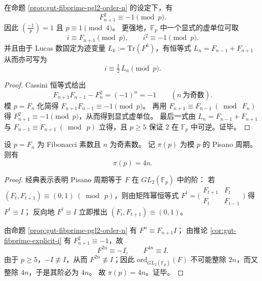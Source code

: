 \begin{corollary}\label{cor:gut-fibprime-explicit-i}
在命题 \ref{prop:gut-fibprime-pgl2-order-n} 的设定下，有
\[
F_{n+1}^2\equiv -1\pmod p.
\]
因此 \(\left(\frac{-1}{p}\right)=1\) 且 \(p\equiv 1\pmod 4\)。
更强地，\(\mathbb{F}_p\) 中一个显式的虚单位可取
\[
i\equiv F_{n+1}\pmod p,
\qquad i^2\equiv -1\pmod p.
\]
并且由于 Lucas 数固定为迹变量 \(L_k:=\mathrm{Tr}(F^k)\)，有恒等式
\(
L_n=F_{n-1}+F_{n+1}
\)
从而亦可写为
\[
i\equiv \tfrac12\,L_n\pmod p.
\]
\end{corollary}
\begin{proof}
Cassini 恒等式给出
\[
F_{n+1}F_{n-1}-F_n^2=(-1)^n=-1
\qquad(n\ \text{为奇数}).
\]
模 \(p=F_n\) 化简得 \(F_{n+1}F_{n-1}\equiv -1\pmod p\)。
再用 \(F_{n+1}\equiv F_{n-1}\ (\bmod\ F_n)\) 得 \(F_{n+1}^2\equiv -1\pmod p\)，从而得到显式虚单位。
最后一式由 \(L_n=F_{n-1}+F_{n+1}\) 与 \(F_{n-1}\equiv F_{n+1}\ (\bmod\ p)\) 立得，且 \(p\ge 5\) 保证 \(2\) 在 \(\mathbb{F}_p\) 中可逆。证毕。
\end{proof}

\begin{corollary}[Pisano 周期的精确封口：\texorpdfstring{$\pi(p)=4n$}{pi(p)=4n}]\label{cor:gut-fibprime-pisano-4n}
设 \(p=F_n\) 为 Fibonacci 素数且 \(n\) 为奇素数。
记 \(\pi(p)\) 为模 \(p\) 的 Pisano 周期。
则有
\[
\pi(p)=4n.
\]
\end{corollary}
\begin{proof}
经典表示表明 Pisano 周期等于 \(F\) 在 \(GL_2(\mathbb{F}_p)\) 中的阶：
若 \((F_t,F_{t+1})\equiv(0,1)\ (\bmod\ p)\)，则由矩阵幂恒等式
\(
F^t=\bigl(\begin{smallmatrix}F_{t+1}&F_t\\F_t&F_{t-1}\end{smallmatrix}\bigr)
\)
得 \(F^t\equiv I\)；
反向地 \(F^t\equiv I\) 立即推出 \((F_t,F_{t+1})\equiv(0,1)\)。
\par
由命题 \ref{prop:gut-fibprime-pgl2-order-n} 有 \(F^n\equiv F_{n+1}I\)；
由推论 \ref{cor:gut-fibprime-explicit-i} 有 \(F_{n+1}^2\equiv -1\)，故
\[
F^{2n}\equiv -I,\qquad F^{4n}\equiv I.
\]
由于 \(p\ge 5\)，\(-I\not\equiv I\)，从而 \(F^{2n}\not\equiv I\)；因此 \(\mathrm{ord}_{GL_2(\mathbb{F}_p)}(F)\) 不可能整除 \(2n\)，而又整除 \(4n\)，于是其阶必为 \(4n\)。
故 \(\pi(p)=4n\)。证毕。
\end{proof}

